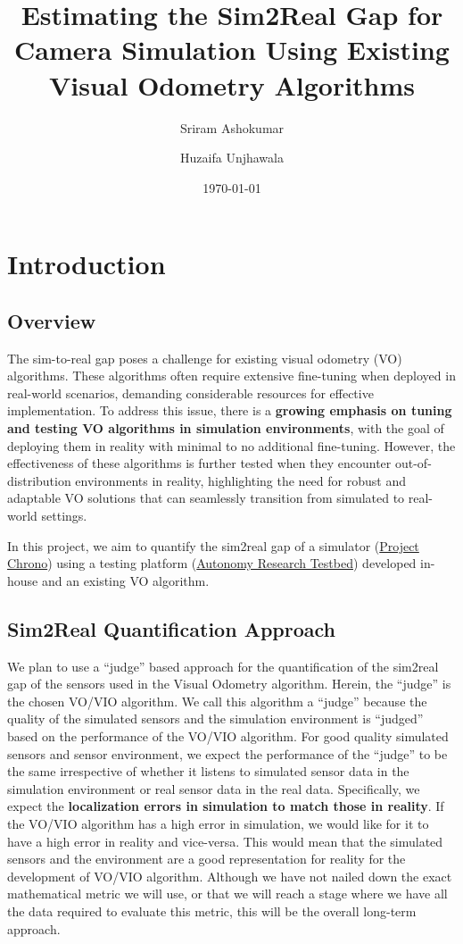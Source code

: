 \documentclass{article}
\title{Estimating the Sim2Real Gap for Camera Simulation Using Existing Visual Odometry Algorithms}
\author{Sriram Ashokumar \and Huzaifa Unjhawala}
\date{\today}
\begin{document}
\maketitle

\section{Introduction}
\subsection{Overview}
The sim-to-real gap poses a challenge for existing visual odometry (VO) algorithms. These algorithms often require extensive fine-tuning when deployed in real-world scenarios, demanding considerable resources for effective implementation. To address this issue, there is a \textbf{growing emphasis on tuning and testing VO algorithms in simulation environments}, with the goal of deploying them in reality with minimal to no additional fine-tuning. However, the effectiveness of these algorithms is further tested when they encounter out-of-distribution environments in reality, highlighting the need for robust and adaptable VO solutions that can seamlessly transition from simulated to real-world settings.  

In this project, we aim to quantify the sim2real gap of a simulator (\href{https://projectchrono.org/}{Project Chrono}) using a testing platform (\href{https://github.com/uwsbel/autonomy-research-testbed}{Autonomy Research Testbed}) developed in-house and an existing VO algorithm.

\subsection{Sim2Real Quantification Approach}
We plan to use a ``judge'' based approach for the quantification of the sim2real gap of the sensors used in the Visual Odometry algorithm. Herein, the ``judge'' is the chosen VO/VIO algorithm. We call this algorithm a ``judge'' because the quality of the simulated sensors and the simulation environment is ``judged'' based on the performance of the VO/VIO algorithm. For good quality simulated sensors and sensor environment, we expect the performance of the ``judge'' to be the same irrespective of whether it listens to simulated sensor data in the simulation environment or real sensor data in the real data. Specifically, we expect the \textbf{localization errors in simulation to match those in reality}. If the VO/VIO algorithm has a high error in simulation, we would like for it to have a high error in reality and vice-versa. This would mean that the simulated sensors and the environment are a good representation for reality for the development of VO/VIO algorithm. Although we have not nailed down the exact mathematical metric we will use, or that we will reach a stage where we have all the data required to evaluate this metric, this will be the overall long-term approach.
\end{document}
